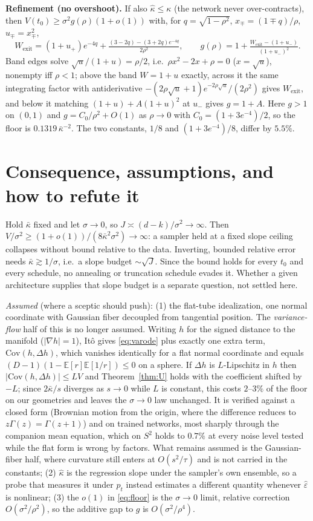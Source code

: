 \documentclass[10pt]{article}
\newcommand{\kb}{\bar\kappa}
\newcommand{\sigsq}{\sigma^2}
\newcommand{\E}{\mathbb{E}}
\begin{document}
\noindent\textbf{Refinement (no overshoot).} If also $\hat\kappa\le\kappa$ (the network never
over-contracts), then $V(t_0)\ge\sigsq g(\rho)(1+o(1))$ with, for $q=\sqrt{1-\rho^2}$,
$x_\mp=(1\mp q)/\rho$, $u_\mp=x_\mp^2$,
\[
W_{\mathrm{exit}}=(1+u_+)e^{-4q}+\tfrac{(3-2q)-(3+2q)e^{-4q}}{2\rho^2},\qquad
g(\rho)=1+\tfrac{W_{\mathrm{exit}}-(1+u_-)}{(1+u_-)^2}.
\]
Band edges solve $\sqrt u/(1+u)=\rho/2$, i.e.\ $\rho x^2-2x+\rho=0$ ($x=\sqrt u$), nonempty iff
$\rho<1$; above the band $W=1+u$ exactly, across it the same integrating factor with
antiderivative $-(2\rho\sqrt u+1)e^{-2\rho\sqrt u}/(2\rho^2)$ gives $W_{\mathrm{exit}}$, and
below it matching $(1+u)+A(1+u)^2$ at $u_-$ gives $g=1+A$. Here $g>1$ on $(0,1)$ and
$g=C_0/\rho^2+O(1)$ as $\rho\to0$ with $C_0=(1+3e^{-4})/2$, so the floor is
$0.1319\,\kb^{-2}$. The two constants, $1/8$ and $(1+3e^{-4})/8$, differ by $5.5\%$.

\section{Consequence, assumptions, and how to refute it}
Hold $\kb$ fixed and let $\sigma\to0$, so $J\asymp(d-k)/\sigsq\to\infty$. Then
$V/\sigsq\ge(1+o(1))/(8\kb^2\sigsq)\to\infty$: a sampler held at a fixed slope ceiling
collapses without bound relative to the data. Inverting, bounded relative error needs
$\kb\gtrsim1/\sigma$, i.e.\ a slope budget $\sim\sqrt J$. Since the bound holds for every $t_0$ and every schedule, no
annealing or truncation schedule evades it. Whether a given architecture supplies that
slope budget is a separate question, not settled here.

\emph{Assumed} (where a sceptic should push): (1) the flat-tube idealization, one normal
coordinate with Gaussian fiber decoupled from tangential position. The \emph{variance-flow}
half of this is no longer assumed. Writing $h$ for the signed distance to the manifold
($|\nabla h|=1$), It\^o gives \eqref{eq:varode} plus exactly one extra term,
$\mathrm{Cov}(h,\Delta h)$, which vanishes identically for a flat normal coordinate and
equals $(D-1)(1-\E[r]\E[1/r])\le0$ on a sphere. If $\Delta h$ is $L$-Lipschitz in $h$ then
$|\mathrm{Cov}(h,\Delta h)|\le LV$ and Theorem~\ref{thm:U} holds with the coefficient shifted
by $-L$; since $2\kb/s$ diverges as $s\to0$ while $L$ is constant, this costs $2$--$3\%$ of
the floor on our geometries and leaves the $\sigma\to0$ law unchanged. It is verified against
a closed form (Brownian motion from the origin, where the difference reduces to
$z\Gamma(z)=\Gamma(z+1)$) and on trained networks, most sharply through the companion mean
equation, which on $S^2$ holds to $0.7\%$ at every noise level tested while the flat form is
wrong by factors. What remains assumed is the Gaussian-fiber half, where curvature still
enters at $O(s^2/\tau)$ and is not carried in the constants; (2) $\hat\kappa$ is the regression slope under
the sampler's own ensemble, so a probe that measures it under $p_t$ instead estimates a
different quantity whenever $\hat\varepsilon$ is nonlinear; (3) the $o(1)$ in
\eqref{eq:floor} is the $\sigma\to0$ limit, relative correction $O(\sigsq/\rho^2)$, so the
additive gap to $g$ is $O(\sigsq/\rho^4)$.
\end{document}
